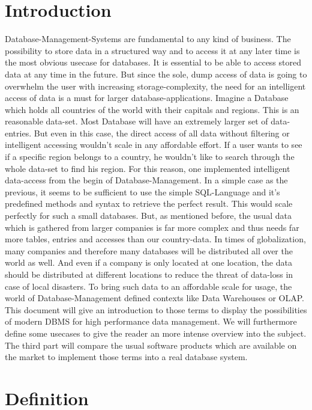 \documentclass[12pt,a4paper,oneside,
liststotoc, 					%
bibtotoc,						%
titlepage, 						%
headsepline, 					%
BCOR6mm,						%
openany,							%
]{scrreprt}
\begin{document}
\chapter{Introduction}
Database-Management-Systems are fundamental to any kind of business. The possibility to store data in a structured way and to access it at any later time is the most obvious usecase for databases. It is essential to be able to access stored data at any time in the future. But since the sole, dump access of data is going to overwhelm the user with increasing storage-complexity, the need for an intelligent access of data is a must for larger database-applications. Imagine a Database which holds all countries of the world with their capitals and regions. This is an reasonable data-set. Most Database will have an extremely larger set of data-entries. But even in this case, the direct access of all data without filtering or intelligent accessing wouldn't scale in any affordable effort. If a user wants to see if a specific region belongs to a country, he wouldn't like to search through the whole data-set to find his region. For this reason, one implemented intelligent data-access from the begin of Database-Management. In a simple case as the previous, it seems to be sufficient to use the simple SQL-Language and it's predefined methods and syntax to retrieve the perfect result. This would scale perfectly for such a small databases. But, as mentioned before, the usual data which is gathered from larger companies is far more complex and thus needs far more tables, entries and accesses than our country-data. In times of globalization, many companies and therefore many databases will be distributed all over the world as well. And even if a company is only located at one location, the data should be distributed at different locations to reduce the threat of data-loss in case of local disasters. To bring such data to an affordable scale for usage, the world of Database-Management defined contexts like Data Warehouses or OLAP. This document will give an introduction to those terms to display the possibilities of modern DBMS for high performance data management. We will furthermore define some usecases to give the reader an more intense overview into the subject. The third part will compare the usual software products which are available on the market to implement those terms into a real database system.
\chapter{ Definition }\label{definition}
\end{document}
